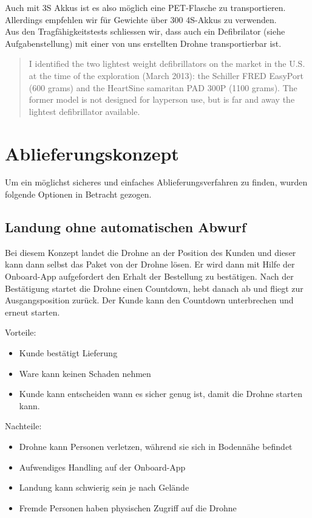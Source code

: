 Auch mit 3S Akkus ist es also möglich eine PET-Flasche zu transportieren. Allerdings empfehlen wir für Gewichte über 300 4S-Akkus zu verwenden.\\

Aus den Tragfähigkeitstests schliessen wir, dass auch ein Defibrilator (siehe Aufgabenstellung) mit einer von uns erstellten Drohne transportierbar ist.
\blockquote{I identified the two lightest weight defibrillators on the market in the U.S. at the time of the exploration (March 2013): the Schiller FRED EasyPort (600 grams) and the HeartSine samaritan PAD 300P (1100 grams). The former model is not designed for layperson use, but is far and away the lightest defibrillator available.} 
\cite[p.3]{FleckUAV}


\section{Ablieferungskonzept}

Um ein möglichst sicheres und einfaches Ablieferungsverfahren zu finden, wurden folgende Optionen in Betracht gezogen.

\subsection{Landung ohne automatischen Abwurf}

Bei diesem Konzept landet die Drohne an der Position des Kunden und dieser kann dann selbst das Paket von der Drohne lösen. Er wird dann mit Hilfe der Onboard-App aufgefordert den Erhalt der Bestellung zu bestätigen. Nach der Bestätigung startet die Drohne einen Countdown, hebt danach ab und fliegt zur Ausgangsposition zurück. Der Kunde kann den Countdown unterbrechen und erneut starten.

Vorteile:
\begin{itemize}
	\item Kunde bestätigt Lieferung
	\item Ware kann keinen Schaden nehmen
	\item Kunde kann entscheiden wann es sicher genug ist, damit die Drohne starten kann.
\end{itemize}


Nachteile:
\begin{itemize}
	\item Drohne kann Personen verletzen, während sie sich in Bodennähe befindet
	\item Aufwendiges Handling auf der Onboard-App
	\item Landung kann schwierig sein je nach Gelände
	\item Fremde Personen haben physischen Zugriff auf die Drohne
\end{itemize}

